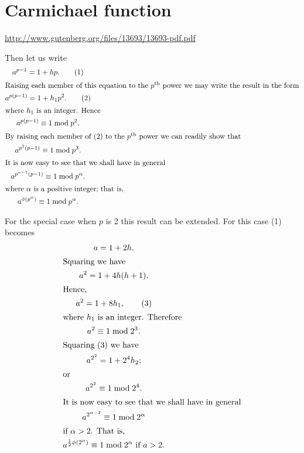 \section{Carmichael function}




\url{http://www.gutenberg.org/files/13693/13693-pdf.pdf}
    



Then let us write
\begin{gather}
a^{p-1} = 1 + hp. \tag{1} \\
\intertext{Raising each member of this equation to the
$p^{\text{th}}$ power we may write the result in the form}
a^{p(p-1)} = 1 + h_1p^2. \tag{2} \\
\intertext{where $h_1$ is an integer. Hence}
a^{p(p-1)} \equiv 1 \bmod p^2. \notag \\
\intertext{By raising each member of (2) to the $p^{\text{th}}$
power we can readily show that}
a^{p^2(p-1)} \equiv 1 \bmod p^3. \notag \\
\intertext{It is now easy to see that we shall have in general}
a^{p^{\alpha - 1}(p-1)} \equiv 1 \bmod p^{\alpha}. \notag \\
\intertext{where $\alpha$ is a positive integer; that is,}
a^{\phi(p^{\alpha})} \equiv 1 \bmod p^{\alpha}. \notag
\end{gather}


    
For the special case when $p$ is 2 this result can be extended. For
this case (1) becomes
\begin{gather}
a = 1 + 2h. \notag \\
\intertext{Squaring we have}
a^2 = 1 + 4h(h+1). \notag \\
\intertext{Hence,}
a^2 = 1+8h_1, \tag{3} \\
\intertext{where $h_1$ is an integer. Therefore}
a^2 \equiv 1 \bmod 2^3. \notag \\
\intertext{Squaring (3) we have}
a^{2^2} = 1 + 2^4h_2; \notag \\
\intertext{or}
a^{2^2} \equiv 1 \bmod 2^4. \notag \\
\intertext{It is now easy to see that we shall have in general}
a^{2^{\alpha-2}} \equiv 1 \bmod 2^{\alpha} \notag \\
\intertext{if $\alpha > 2$. That is,}
a^{\frac{1}{2}\phi(2^{\alpha})} \equiv 1 \bmod 2^{\alpha}
  \text{ if } a > 2.
\end{gather}

